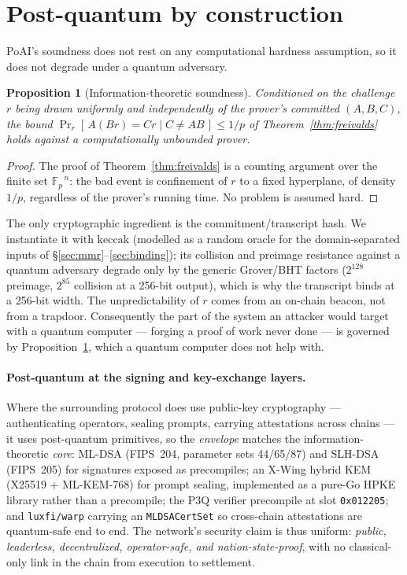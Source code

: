 \documentclass[11pt]{article}
\newtheorem{proposition}[theorem]{Proposition}
\newcommand{\Fp}{\ensuremath{\mathbb{F}_p}}
\newcommand{\keccak}{\ensuremath{\mathrm{keccak}}}
\newcommand{\code}[1]{\texttt{#1}}
\begin{document}
\section{Post-quantum by construction}
\label{sec:pq}

PoAI's soundness does not rest on any computational hardness assumption, so it
does not degrade under a quantum adversary.

\begin{proposition}[Information-theoretic soundness]
\label{prop:itsound}
Conditioned on the challenge $r$ being drawn uniformly and independently of the
prover's committed $(A,B,C)$, the bound $\Pr_r[\,A(Br)=Cr \mid C\neq AB\,]\le 1/p$
of Theorem~\ref{thm:freivalds} holds against a computationally unbounded prover.
\end{proposition}

\begin{proof}
The proof of Theorem~\ref{thm:freivalds} is a counting argument over the finite
set $\Fp^{\,n}$: the bad event is confinement of $r$ to a fixed hyperplane, of
density $1/p$, regardless of the prover's running time. No problem is assumed
hard.
\end{proof}

The only cryptographic ingredient is the commitment/transcript hash. We instantiate
it with \keccak{} (modelled as a random oracle for the domain-separated inputs of
\S\ref{sec:mmr}--\ref{sec:binding}); its collision and preimage resistance against
a quantum adversary degrade only by the generic Grover/BHT factors
($2^{128}$ preimage, $2^{85}$ collision at a 256-bit output), which is why the
transcript binds at a 256-bit width. The unpredictability of $r$ comes from an
on-chain beacon, not from a trapdoor. Consequently the part of the system an
attacker would target with a quantum computer --- forging a proof of work never
done --- is governed by Proposition~\ref{prop:itsound}, which a quantum computer
does not help with.

\paragraph{Post-quantum at the signing and key-exchange layers.} Where the
surrounding protocol does use public-key cryptography --- authenticating operators,
sealing prompts, carrying attestations across chains --- it uses post-quantum
primitives, so the \emph{envelope} matches the information-theoretic \emph{core}:
ML-DSA (FIPS~204, parameter sets 44/65/87) and SLH-DSA (FIPS~205) for signatures
exposed as precompiles; an X-Wing hybrid KEM (X25519 + ML-KEM-768) for prompt
sealing, implemented as a pure-Go HPKE library rather than a precompile; the P3Q
verifier precompile at slot \code{0x012205}; and \code{luxfi/warp} carrying an
\code{MLDSACertSet} so cross-chain attestations are quantum-safe end to end. The
network's security claim is thus uniform: \emph{public, leaderless, decentralized,
operator-safe, and nation-state-proof}, with no classical-only link in the chain
from execution to settlement.
\end{document}
